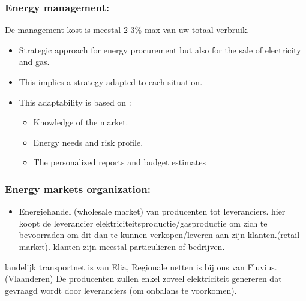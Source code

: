 \documentclass[12pt]{article}
\begin{document}
\subsubsection{Energy management:}
De management kost is meestal 2-3\% max van uw totaal verbruik.
\begin{itemize}
    \item Strategic approach for energy procurement but also for the sale of
    electricity and gas.
    \item This implies a strategy adapted to each situation.
    \item This adaptability is based on :\begin{itemize}
        \item Knowledge of the market.
        \item Energy needs and risk profile.
        \item The personalized reports and budget estimates
    \end{itemize}
\end{itemize}
\subsubsection{Energy markets organization:}
\begin{itemize}
    \item Energiehandel (wholesale market) van producenten tot leveranciers. hier koopt de leverancier elektriciteitsproductie/gasproductie om zich te bevoorraden om dit dan te kunnen verkopen/leveren aan zijn klanten.(retail market). klanten zijn meestal particulieren of bedrijven.
\end{itemize}
landelijk transportnet is van Elia, Regionale netten is bij ons van Fluvius. (Vlaanderen) De producenten zullen enkel zoveel elektriciteit genereren dat gevraagd wordt door leveranciers (om onbalans te voorkomen).
\end{document}
